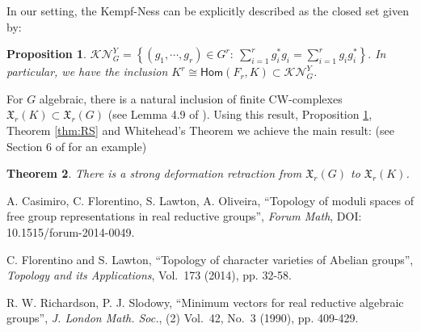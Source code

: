 \documentclass[a4paper,11pt,twoside]{article}
\newcounter{a}
\numberwithin{equation}{section}
\numberwithin{figure}{section}
\theoremstyle{plain}
\newtheorem{thm}{Theorem}[section]
\theoremstyle{definition}
\theoremstyle{remark}
\theoremstyle{plain}
\theoremstyle{plain}
\newtheorem{prop}[thm]{Proposition}
\theoremstyle{plain}
\begin{document}
In our setting, the Kempf-Ness can be explicitly described as the closed set given by:
\begin{prop}
\label{pro:general-KN} $
\mathcal{KN}_{G}^{Y}=\left\{(g_{1},\cdots,g_{r})\in G^{r}:\ \sum_{i=1}^{r}g_{i}^{*}g_{i}=\sum_{i=1}^{r}g_{i}g_{i}^{*}\right\}.$
In particular, we have the inclusion $K^{r}\cong{\mathsf{Hom}}(F_{r},K)\subset\mathcal{KN}_{G}^{Y}$.
\end{prop}
For $G$ algebraic, there is a natural inclusion of finite CW-complexes $\mathfrak{X}_{r}(K)\subset\mathfrak{X}_{r}(G)$ (see Lemma 4.9 of \cite{Casimiro-Florentino-Lawton-Oliveira:2014}). Using this result,
 Proposition \ref{pro:general-KN},  Theorem \ref{thm:RS} and Whitehead's Theorem we achieve the main result: (see Section 6 of \cite{Casimiro-Florentino-Lawton-Oliveira:2014} for an example)
\begin{thm}\label{thm:maintheorem}
There is a strong deformation retraction from $\mathfrak{X}_{r}(G)$
to $\mathfrak{X}_{r}(K)$.
\end{thm}

\begin{thebibliography}{99}

\small{
 A. Casimiro, C. Florentino, S. Lawton, A. Oliveira, ``Topology of moduli spaces of free group representations in real reductive groups'',
 \emph{Forum Math}, DOI: 10.1515/forum-2014-0049.

 C. Florentino and S. Lawton, ``Topology of character varieties of Abelian groups'',
 \emph{Topology and its Applications}, Vol.~173 (2014), pp. 32-58.

 R. W. Richardson, P. J. Slodowy, ``Minimum
vectors for real reductive algebraic groups'', \emph{J. London Math. Soc.}, (2) Vol.~42, No.~3 (1990), pp. 409-429.
}

\end{thebibliography}
\end{document}
